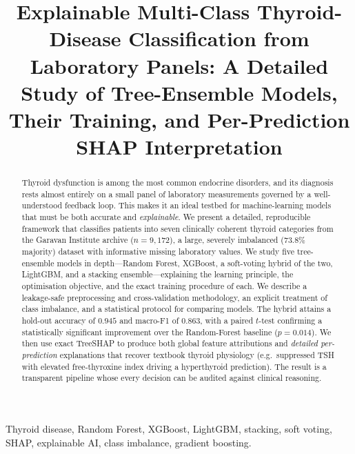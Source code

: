 \documentclass[conference]{IEEEtran}
\begin{document}
\title{Explainable Multi-Class Thyroid-Disease Classification from\\
Laboratory Panels: A Detailed Study of Tree-Ensemble Models,\\
Their Training, and Per-Prediction SHAP Interpretation}

\author{
}

\maketitle

\begin{abstract}
Thyroid dysfunction is among the most common endocrine disorders, and its
diagnosis rests almost entirely on a small panel of laboratory measurements
governed by a well-understood feedback loop. This makes it an ideal testbed for
machine-learning models that must be both accurate and \emph{explainable}. We
present a detailed, reproducible framework that classifies patients into seven
clinically coherent thyroid categories from the Garavan Institute archive
($n{=}9{,}172$), a large, severely imbalanced ($73.8\%$ majority) dataset with
informative missing laboratory values. We study five tree-ensemble models in
depth---Random Forest, XGBoost, a soft-voting hybrid of the two, LightGBM, and a
stacking ensemble---explaining the learning principle, the optimisation
objective, and the exact training procedure of each. We describe a leakage-safe
preprocessing and cross-validation methodology, an explicit treatment of class
imbalance, and a statistical protocol for comparing models. The hybrid attains a
hold-out accuracy of $0.945$ and macro-F1 of $0.863$, with a paired $t$-test
confirming a statistically significant improvement over the Random-Forest baseline
($p{=}0.014$). We then use exact TreeSHAP to produce both global feature
attributions and \emph{detailed per-prediction} explanations that recover textbook
thyroid physiology (e.g.\ suppressed TSH with elevated free-thyroxine index
driving a hyperthyroid prediction). The result is a transparent pipeline whose
every decision can be audited against clinical reasoning.
\end{abstract}

\begin{IEEEkeywords}
Thyroid disease, Random Forest, XGBoost, LightGBM, stacking, soft voting, SHAP,
explainable AI, class imbalance, gradient boosting.
\end{IEEEkeywords}
\end{document}
